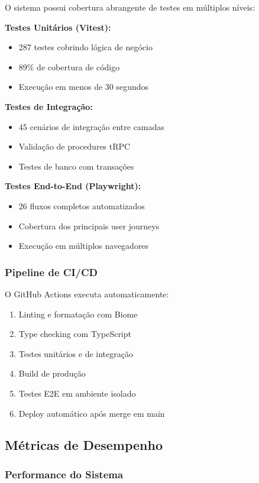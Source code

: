 \documentclass[portuguese]{sbc2025}%
\begin{document}
O sistema possui cobertura abrangente de testes em múltiplos níveis:

\textbf{Testes Unitários (Vitest):}
\begin{itemize}
  \item 287 testes cobrindo lógica de negócio
  \item 89\% de cobertura de código
  \item Execução em menos de 30 segundos
\end{itemize}

\textbf{Testes de Integração:}
\begin{itemize}
  \item 45 cenários de integração entre camadas
  \item Validação de procedures tRPC
  \item Testes de banco com transações
\end{itemize}

\textbf{Testes End-to-End (Playwright):}
\begin{itemize}
  \item 26 fluxos completos automatizados
  \item Cobertura dos principais user journeys
  \item Execução em múltiplos navegadores
\end{itemize}

\subsubsection{Pipeline de CI/CD}

O GitHub Actions executa automaticamente:
\begin{enumerate}
  \item Linting e formatação com Biome
  \item Type checking com TypeScript
  \item Testes unitários e de integração
  \item Build de produção
  \item Testes E2E em ambiente isolado
  \item Deploy automático após merge em main
\end{enumerate}

\subsection{Métricas de Desempenho}

\subsubsection{Performance do Sistema}
\end{document}
